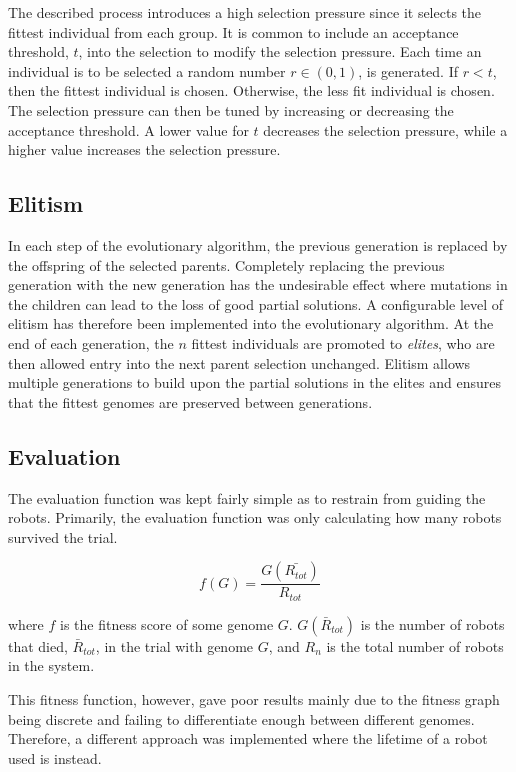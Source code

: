 The described process introduces a high selection pressure since it selects the fittest individual from each group.
It is common to include an acceptance threshold, $t$, into the selection to modify the selection pressure\cite{goh_sexual_2003}.
Each time an individual is to be selected a random number $r \in (0, 1)$, is generated.
If $r < t$, then the fittest individual is chosen. 
Otherwise, the less fit individual is chosen. 
The selection pressure can then be tuned by increasing or decreasing the acceptance threshold. 
A lower value for $t$ decreases the selection pressure, while a higher value increases the selection pressure.

\subsection{Elitism}
In each step of the evolutionary algorithm, the previous generation is replaced by the offspring of the selected parents.
Completely replacing the previous generation with the new generation has the undesirable effect where mutations in the children can lead to the loss of good partial solutions.
A configurable level of elitism has therefore been implemented into the evolutionary algorithm.
At the end of each generation, the $n$ fittest individuals are promoted to \emph{elites}, who are then allowed entry into the next parent selection unchanged.
Elitism allows multiple generations to build upon the partial solutions in the elites and ensures that the fittest genomes are preserved between generations.

\subsection{Evaluation}
\label{sec:evaluation}
The evaluation function was kept fairly simple as to restrain from guiding the robots.
Primarily, the evaluation function was only calculating how many robots survived the trial.

\begin{equation}
\label{eq:basic_fitness}
f(G) = \frac{G(\bar{R_{tot}})}{R_{tot}}
\end{equation}

where $f$ is the fitness score of some genome $G$.
$G(\bar{R}_{tot})$ is the number of robots that died, $\bar{R}_{tot}$, in the trial with genome $G$, and $R_n$ is the total number of robots in the system.

This fitness function, however, gave poor results mainly due to the fitness graph being discrete and failing to differentiate enough between different genomes.
Therefore, a different approach was implemented where the lifetime of a robot used is instead.

